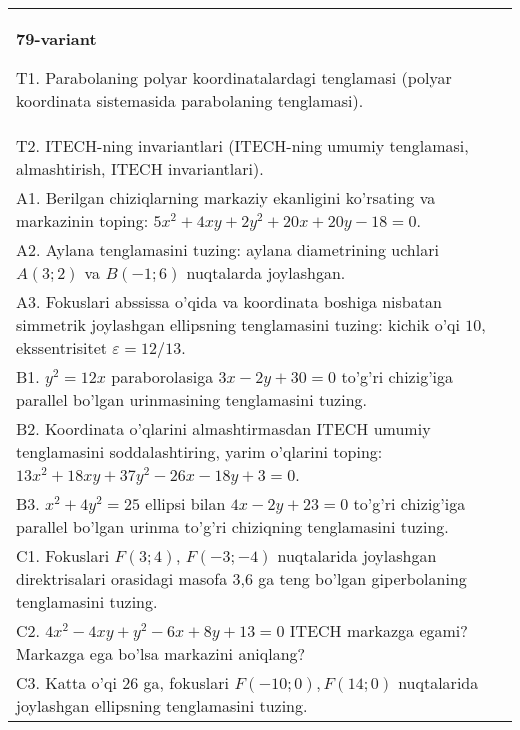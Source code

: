 \documentclass{article}
\begin{document}
\begin{tabular}{m{17cm}}
\textbf{79-variant}
\newline

T1. Parabolaning polyar koordinatalardagi tenglamasi (polyar koordinata sistemasida parabolaning tenglamasi).\\

T2. ITECH-ning invariantlari (ITECH-ning umumiy tenglamasi, almashtirish, ITECH invariantlari).\\

A1. Berilgan chiziqlarning markaziy ekanligini ko'rsating va markazinin toping: $5x^{2}+4xy+2y^{2}+20x+20y-18=0$.\\

A2. Aylana tenglamasini tuzing: aylana diametrining uchlari $A(3;2)$ va $B(-1;6)$ nuqtalarda joylashgan.\\

A3. Fokuslari abssissa o'qida va koordinata boshiga nisbatan simmetrik joylashgan ellipsning tenglamasini tuzing: kichik o'qi $10$, ekssentrisitet $\varepsilon=12/13$.\\

B1. $y^{2} = 12x$ paraborolasiga $3x - 2y + 30 = 0$ to'g'ri chizig'iga parallel bo'lgan urinmasining tenglamasini tuzing.  \\

B2. Koordinata o'qlarini almashtirmasdan ITECH umumiy tenglamasini soddalashtiring, yarim o'qlarini toping: $13x^{2} + 18xy + 37y^{2} - 26x - 18y + 3 = 0$.  \\

B3. $x^{2} + 4y^{2} = 25$ ellipsi bilan $4x - 2y + 23 = 0$ to'g'ri chizig'iga parallel bo'lgan urinma to'g'ri chiziqning tenglamasini tuzing.  \\

C1. Fokuslari $F(3;4)$, $F(-3;-4)$ nuqtalarida joylashgan direktrisalari orasidagi masofa 3,6 ga teng bo'lgan giperbolaning tenglamasini tuzing.  \\

C2. $4x^{2} - 4xy + y^{2} - 6x + 8y + 13 = 0$ ITECH markazga egami? Markazga ega bo'lsa markazini aniqlang?  \\

C3. Katta o'qi 26 ga, fokuslari $F( - 10;0), F(14;0)$ nuqtalarida joylashgan ellipsning tenglamasini tuzing.  \\

\end{tabular}
\vspace{1cm}
\end{document}

